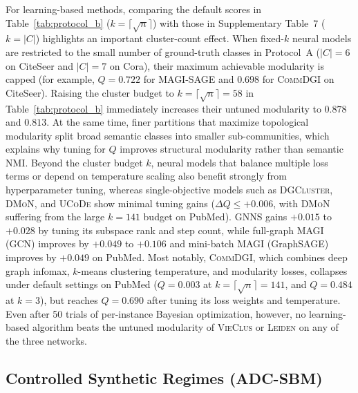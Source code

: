 \documentclass[11pt,a4paper]{article}
\begin{document}
For learning-based methods, comparing the default scores in Table~\ref{tab:protocol_b} ($k = \lceil\sqrt{n}\rceil$) with those in Supplementary Table~7 ($k = |C|$) highlights an important cluster-count effect. When fixed-$k$ neural models are restricted to the small number of ground-truth classes in Protocol~A ($|C| = 6$ on CiteSeer and $|C| = 7$ on Cora), their maximum achievable modularity is capped (for example, $Q = 0.722$ for \textsc{MAGI}-SAGE and $0.698$ for \textsc{CommDGI} on CiteSeer). Raising the cluster budget to $k = \lceil\sqrt{n}\rceil = 58$ in Table~\ref{tab:protocol_b} immediately increases their untuned modularity to $0.878$ and $0.813$. At the same time, finer partitions that maximize topological modularity split broad semantic classes into smaller sub-communities, which explains why tuning for $Q$ improves structural modularity rather than semantic NMI. Beyond the cluster budget $k$, neural models that balance multiple loss terms or depend on temperature scaling also benefit strongly from hyperparameter tuning, whereas single-objective models such as \textsc{DGCluster}, \textsc{DMoN}, and \textsc{UCoDe} show minimal tuning gains ($\Delta Q \le +0.006$, with \textsc{DMoN} suffering from the large $k = 141$ budget on PubMed). \textsc{GNNS} gains $+0.015$ to $+0.028$ by tuning its subspace rank and step count, while full-graph \textsc{MAGI} (GCN) improves by $+0.049$ to $+0.106$ and mini-batch \textsc{MAGI} (GraphSAGE) improves by $+0.049$ on PubMed. Most notably, \textsc{CommDGI}, which combines deep graph infomax, $k$-means clustering temperature, and modularity losses, collapses under default settings on PubMed ($Q = 0.003$ at $k = \lceil\sqrt{n}\rceil = 141$, and $Q = 0.484$ at $k=3$), but reaches $Q = 0.690$ after tuning its loss weights and temperature. Even after 50 trials of per-instance Bayesian optimization, however, no learning-based algorithm beats the untuned modularity of \textsc{VieClus} or \textsc{Leiden} on any of the three networks.

\subsection{Controlled Synthetic Regimes (ADC-SBM)}
\end{document}
